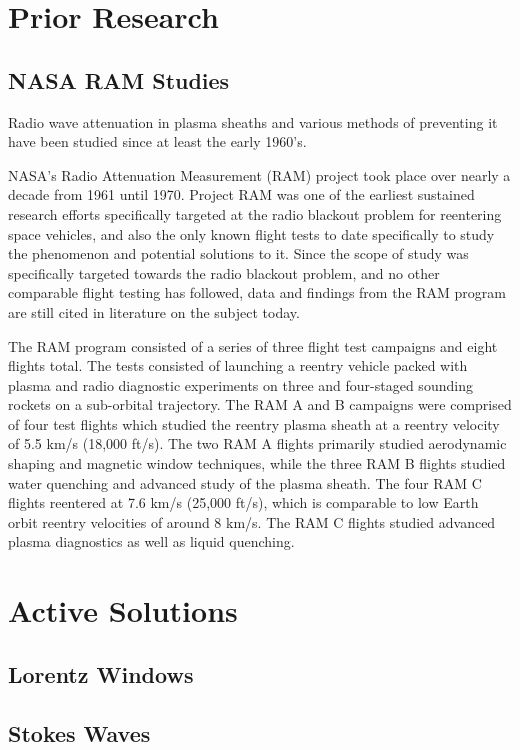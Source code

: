 \documentclass[twocolumn]{article}
\begin{document}
\section{Prior Research}
	\subsection*{NASA RAM Studies}
	Radio wave attenuation in plasma sheaths and various methods of preventing it have been studied since at least the early 1960's.
	
	NASA's Radio Attenuation Measurement (RAM) project took place over nearly a decade from 1961 until 1970.
	Project RAM was one of the earliest sustained research efforts specifically targeted at the radio blackout problem for reentering space vehicles, and also the only known flight tests to date specifically to study the phenomenon and potential solutions to it.
	Since the scope of study was specifically targeted towards the radio blackout problem, and no other comparable flight testing has followed, data and findings from the RAM program are still cited in literature on the subject today.
	
	The RAM program consisted of a series of three flight test campaigns and eight flights total.
	The tests consisted of launching a reentry vehicle packed with plasma and radio diagnostic experiments on three and four-staged sounding rockets on a sub-orbital trajectory.
	The RAM A and B campaigns were comprised of four test flights which studied the reentry plasma sheath at a reentry velocity of 5.5 km/s (18,000 ft/s). \cite{huber_entry_1971}
	The two RAM A flights primarily studied aerodynamic shaping and magnetic window techniques, while the three RAM B flights studied water quenching and advanced study of the plasma sheath.
	The four RAM C flights reentered at 7.6 km/s (25,000 ft/s), which is comparable to low Earth orbit reentry velocities of around 8 km/s. 
	The RAM C flights studied advanced plasma diagnostics as well as liquid quenching. \cite{huber_entry_1971}

\section{Active Solutions}
\subsection*{Lorentz Windows}
\subsection*{Stokes Waves}



\end{document}
